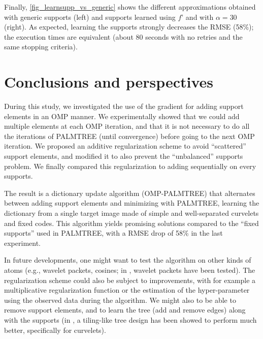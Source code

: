 Finally, \cref{fig_learnsupp_vs_generic} shows the different approximations obtained with generic supports (left) and supports learned using $f’$ and with $\alpha=30$ (right). As expected, learning the supports strongly decreases the RMSE (58\%); the execution times are equivalent (about 80 seconds with no retries and the same stopping criteria).


\FloatBarrier
\section{Conclusions and perspectives}


During this study, we investigated the use of the gradient for adding support elements in an \ac{OMP} manner. We experimentally showed that we could add multiple elements at each \ac{OMP} iteration, and that it is not necessary to do all the iterations of PALMTREE (until convergence) before going to the next OMP iteration. We proposed an  additive regularization scheme to avoid “scattered” support elements, and modified it to also prevent the “unbalanced” supports problem. We finally compared this regularization to adding sequentially on every supports.

\noindent
The result is a dictionary update algorithm (OMP-PALMTREE) that alternates between adding support elements and minimizing with PALMTREE, learning the dictionary from a single target image made of simple and well-separated curvelets and fixed codes. This algorithm yields  promising solutions compared to the “fixed supports” used in PALMTREE, with a RMSE drop of 58\% in the last experiment.

In future developments, one might want to test the algorithm on other kinds of atoms (e.g., wavelet packets, cosines; in \cite{chabiron_optimization_2016}, wavelet packets have been tested). The regularization scheme could also be subject to improvements, with for example a multiplicative regularization function or the estimation of the hyper-parameter using the observed data during the algorithm. We might also to be able to remove support elements, and to learn the tree (add and remove edges) along with the supports (in \cite{chabiron_optimization_2016}, a tiling-like tree design has been showed to perform much better, specifically for curvelets).

